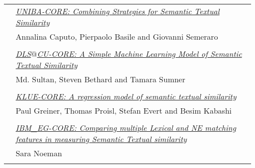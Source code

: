 \begin{tabular}{p{20mm}p{138mm}}
 & \hyperlink{page.169}{\em UNIBA-CORE: Combining Strategies for Semantic Textual Similarity}\\
         & Annalina Caputo, Pierpaolo Basile and Giovanni Semeraro \\
\\

 & \hyperlink{page.176}{\em DLS$@$CU-CORE: A Simple Machine Learning Model of Semantic Textual Similarity}\\
         & Md. Sultan, Steven Bethard and Tamara Sumner \\
\\

 & \hyperlink{page.181}{\em KLUE-CORE: A regression model of semantic textual similarity}\\
         & Paul Greiner, Thomas Proisl, Stefan Evert and Besim Kabashi \\
\\

 & \hyperlink{page.187}{\em IBM\_EG-CORE: Comparing multiple Lexical and NE matching features in measuring Semantic Textual similarity}\\
         & Sara Noeman \\
\\

\end{tabular}
\newpage
